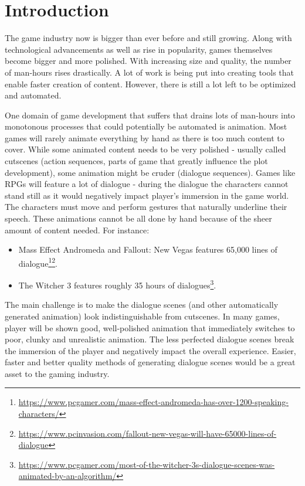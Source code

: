 \chapter{Introduction\label{chap:introduction}}

The game industry now is bigger than ever before and still growing. Along with technological advancements as well as rise in popularity, games themselves become bigger and more polished. With increasing size and quality, the number of man-hours rises drastically. A lot of work is being put into creating tools that enable faster creation of content. However, there is still a lot left to be optimized and automated.

One domain of game development that suffers that drains lots of man-hours into monotonous processes that could potentially be automated is animation. Most games will rarely animate everything by hand as there is too much content to cover. While some animated content needs to be very polished - usually called cutscenes (action sequences, parts of game that greatly influence the plot development), some animation might be cruder (dialogue sequences). Games like RPGs will feature a lot of dialogue - during the dialogue the characters cannot stand still as it would negatively impact player's immersion in the game world. The characters must move and perform gestures that naturally underline their speech. These animations cannot be all done by hand because of the sheer amount of content needed. For instance:

\begin{itemize}
\item Mass Effect Andromeda and Fallout:  New Vegas features 65,000 lines of dialogue\footnote{\url{https://www.pcgamer.com/mass-effect-andromeda-has-over-1200-speaking-characters/}}\footnote{\url{https://www.pcinvasion.com/fallout-new-vegas-will-have-65000-lines-of-dialogue}}.

\item The Witcher 3 features roughly 35 hours of dialogues\footnote{\url{https://www.pcgamer.com/most-of-the-witcher-3s-dialogue-scenes-was-animated-by-an-algorithm/}}.

\end{itemize}

The main challenge is to make the dialogue scenes (and other automatically generated animation) look indistinguishable from cutscenes. In many games, player will be shown good, well-polished animation that immediately switches to poor, clunky and unrealistic animation. The less perfected dialogue scenes break the immersion of the player and negatively impact the overall experience. Easier, faster and better quality methods of generating dialogue scenes would be a great asset to the gaming industry.

